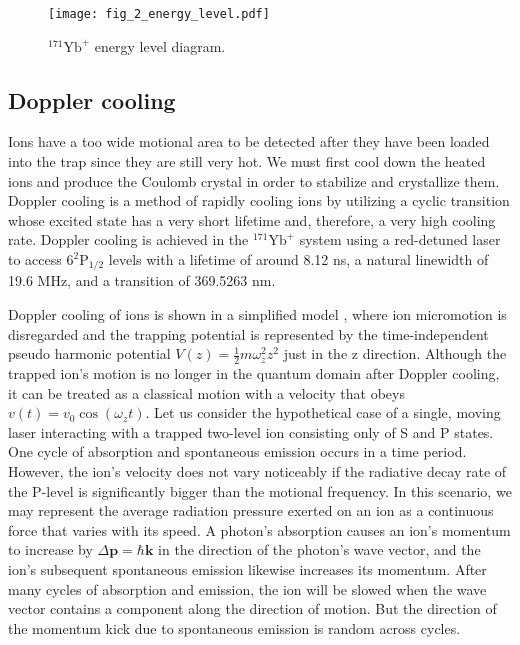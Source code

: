 \begin{figure}
    \centering
    \texttt{[image: fig\_2\_energy\_level.pdf]}
    \caption{${ }^{171} \mathrm{Yb}^{+}$ energy level diagram.}
    \label{fig:energy_level}
\end{figure}

\subsection{Doppler cooling}

Ions have a too wide motional area to be detected after they have been loaded into the trap since they are still very hot. We must first cool down the heated ions and produce the Coulomb crystal in order to stabilize and crystallize them. Doppler cooling \cite{RN124,RN148,RN129,RN216} is a method of rapidly cooling ions by utilizing a cyclic transition whose excited state has a very short lifetime and, therefore, a very high cooling rate. Doppler cooling is achieved in the ${ }^{171} \mathrm{Yb}^{+}$ system using a red-detuned laser to access $6^2 \mathrm{P}_{1 / 2}$ levels with a lifetime of around 8.12 ns, a natural linewidth of 19.6 MHz, and a transition of 369.5263 nm.

Doppler cooling of ions is shown in a simplified model \cite{RN152,RN154,RN243}, where ion micromotion is disregarded and the trapping potential is represented by the time-independent pseudo harmonic potential $V(z)=\frac{1}{2} m \omega_z^2 z^2$ just in the z direction. Although the trapped ion's motion is no longer in the quantum domain after Doppler cooling, it can be treated as a classical motion with a velocity that obeys $v(t)=v_0 \cos \left(\omega_z t\right)$. Let us consider the hypothetical case of a single, moving laser interacting with a trapped two-level ion consisting only of S and P states. One cycle of absorption and spontaneous emission occurs in a time period. However, the ion's velocity does not vary noticeably if the radiative decay rate of the P-level is significantly bigger than the motional frequency. In this scenario, we may represent the average radiation pressure exerted on an ion as a continuous force that varies with its speed. A photon's absorption causes an ion's momentum to increase by $\Delta \mathbf{p}=\hbar \mathbf{k}$ in the direction of the photon's wave vector, and the ion's subsequent spontaneous emission likewise increases its momentum. After many cycles of absorption and emission, the ion will be slowed when the wave vector contains a component along the direction of motion. But the direction of the momentum kick due to spontaneous emission is random across cycles.

